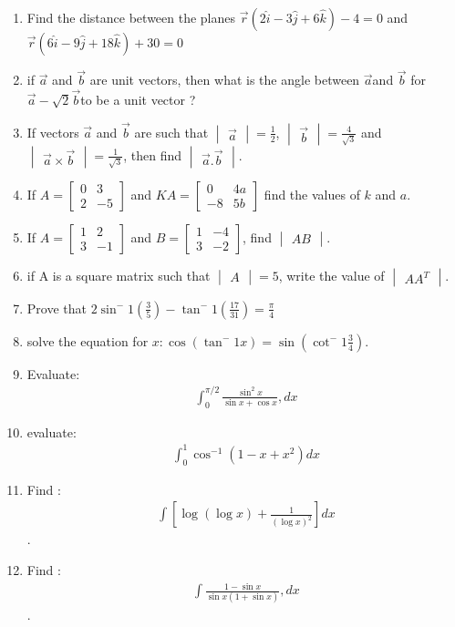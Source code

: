 \documentclass[12pt,-letter paper]{article}
\providecommand{\mydet}[1]{\ensuremath{\begin{vmatrix}#1\end{vmatrix}}}
\providecommand{\myvec}[1]{\ensuremath{\begin{bmatrix}#1\end{bmatrix}}}
\begin{document}
\begin{enumerate}
	\item Find the distance between the planes $\overset{\rightarrow}{r}(2\hat{i}-3\hat{j}+6\hat{k})-4= 0$   and       $\overset{\rightarrow}{r}(6\hat{i}-9\hat{j}+18\hat{k})+30=0$
	\item if $\overset{\rightarrow}{a}$ and $\overset{\rightarrow}{b}$ are unit vectors, then what is the angle between $\overset{\rightarrow}{a}$and $\overset{\rightarrow}{b}$ for $\overset{\rightarrow}{a}-\sqrt{2}  \overset{\rightarrow}{b}$to be a unit vector ?
	\item If vectors $\overset{\rightarrow}{a}$ and $\overset{\rightarrow}{b}$ are such that $\mydet{\overset{\rightarrow}{a}}=\frac{1}{2}$, $\mydet{\overset{\rightarrow}{b}}=\frac{4}{\sqrt{3}}$ and $\mydet{\overset{\rightarrow}{a} \times \overset{\rightarrow}{b}}=\frac{1}{\sqrt{3}}$, then find $\mydet{\overset{\rightarrow}{a}.\overset{\rightarrow}{b}}$.
\item If $A=\myvec{0 & 3 \\ 2 & -5}$ and $KA=\myvec{0 & 4a \\ 
    -8 & 5b }$ find the values of $k$ and $a$.
\item If $A=\myvec{1 & 2 \\ 3 & -1}$ and  $B = \myvec {1 & -4 \\ 3 & -2 }    $, find $\mydet{AB}$.
\item if A is a square matrix such that $\mydet{A}=5$, write the value of $\mydet{AA^T}$.
\item Prove that $2\sin^-1 (\frac{3}{5})-\tan^-1(\frac{17}{31})=\frac{\pi}{4}$
\item solve the equation for $x:\cos(\tan^-1 x)=\sin(\cot^-1\frac{3}{4})$.
\item Evaluate: \begin{align*}\int_{0}^{\pi/2} \frac{\sin^2{x}}{\sin{x} + \cos{x}},dx\end{align*}
\item evaluate: \begin{align*}\int_{0}^{1} \cos^{-1}(1-x+x^2)dx \end{align*}
\item Find : \begin{align*}\int[\log(\log{x})+\frac{1}{(\log{x})^2}]dx\end{align*}.
	\item Find : \begin{align*}\int\frac{1-\sin{x}}{\sin{x}(1+\sin{x})},dx\end{align*}.

\end{enumerate}
\end{document}
